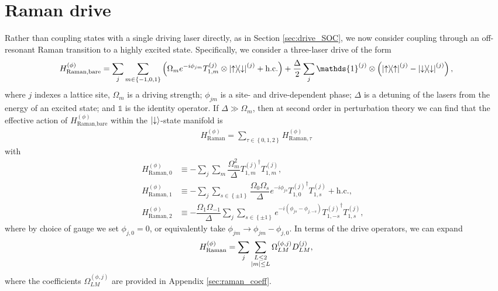 \documentclass[nofootinbib,notitlepage,11pt]{revtex4-2}
\renewcommand{\t}{\text} %
\newcommand{\f}[2]{\dfrac{#1}{#2}} %
\newcommand{\p}[1]{\left(#1\right)} %
\renewcommand{\set}[1]{\left\{#1\right\}} %
\newcommand{\1}{\mathds{1}}
\newcommand{\up}{\uparrow}
\newcommand{\dn}{\downarrow}
\begin{document}
\section{Raman drive}
\label{sec:raman}

Rather than coupling states with a single driving laser directly, as
in Section \ref{sec:drive_SOC}, we now consider coupling through an
off-resonant Raman transition to a highly excited state.
Specifically, we consider a three-laser drive of the form
\begin{align}
  H_{\t{Raman,bare}}^{(\phi)}
  = \sum_j \sum_{m\in\set{-1,0,1}} \p{\Omega_m e^{-i\phi_{jm}}
    T_{1,m}^{(j)} \otimes \op{\up}{\dn}^{(j)} + \t{h.c.}}
  + \f{\Delta}{2} \sum_j \1^{(j)}
  \otimes \p{\op{\up}^{(j)} - \op{\dn}^{(j)}},
  \label{eq:raman_bare}
\end{align}
where $j$ indexes a lattice site, $\Omega_m$ is a driving strength;
$\phi_{jm}$ is a site- and drive-dependent phase; $\Delta$ is a
detuning of the lasers from the energy of an excited state; and $\1$
is the identity operator.  If $\Delta\gg\Omega_m$, then at second
order in perturbation theory we can find that the effective action of
$H_{\t{Raman,bare}}^{(\phi)}$ within the $\ket{\dn}$-state manifold is
\begin{align}
  H_{\t{Raman}}^{(\phi)}
  = \sum_{\tau\in\set{0,1,2}} H_{\t{Raman},\tau}^{(\phi)}
\end{align}
with
\begin{align}
  H_{\t{Raman},0}^{(\phi)}
  &\equiv -\sum_j\sum_m \f{\Omega_m^2}{\Delta}
  {T_{1,m}^{(j)}}^\dag T_{1,m}^{(j)}, & \label{eq:raman_0} \\
  H_{\t{Raman},1}^{(\phi)}
  &\equiv -\sum_j\sum_{s\in\set{\pm1}}
  \f{\Omega_0\Omega_s}{\Delta} e^{-i\phi_{js}}
  {T_{1,0}^{(j)}}^\dag T_{1,s}^{(j)} + \t{h.c.},
  \\
  H_{\t{Raman},2}^{(\phi)}
  &\equiv -\f{\Omega_1\Omega_{-1}}{\Delta}
  \sum_j\sum_{s\in\set{\pm1}} e^{-i\p{\phi_{js}-\phi_{j,-s}}}
  {T_{1,-s}^{(j)}}^\dag T_{1,s}^{(j)},
  \label{eq:raman_2}
\end{align}
where by choice of gauge we set $\phi_{j,0}=0$, or equivalently take
$\phi_{jm}\to\phi_{jm}-\phi_{j,0}$.  In terms of the drive operators,
we can expand
\begin{align}
  H_{\t{Raman}}^{(\phi)}
  = \sum_j \sum_{\substack{L\le2\\\abs{m}\le L}}
  \Omega_{LM}^{(\phi,j)} D_{LM}^{(j)},
  \label{eq:raman_drive}
\end{align}
where the coefficients $\Omega_{LM}^{(\phi,j)}$ are provided in
Appendix \ref{sec:raman_coeff}.
\end{document}
